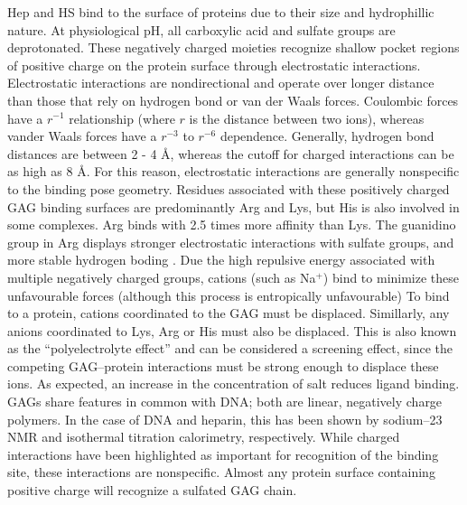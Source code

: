 \documentclass[journal=jctcce,manuscript=article]{achemso}
\begin{document}
{\ac{Hep} and \ac{HS} bind to the surface of proteins due to their size and hydrophillic nature. At physiological pH, all carboxylic acid and sulfate groups are deprotonated.\cite{Capila2002Heparin-proteinInteractions., Gandhi2008TheProteins, Casu2005StructureHeparin, Imberty2007StructuralInteractions}
These negatively charged moieties recognize shallow pocket regions of positive charge on the protein surface through electrostatic interactions.\cite{Capila2002Heparin-proteinInteractions., Gandhi2008TheProteins, Casu2005StructureHeparin, Imberty2007StructuralInteractions}
Electrostatic interactions are nondirectional and operate over longer distance than those that rely on hydrogen bond or van der Waals forces. Coulombic forces have a $ r^{-1}$  relationship (where $r$ is the distance between two ions), whereas vander Waals forces have a  $ r^{-3}$ to  $ r^{-6}$ dependence. \cite{Sankaranarayanan2014TowardProteins, Kirschner2008GLYCAM06:Carbohydrates} 
Generally, hydrogen bond distances are between 2 - 4 \AA, whereas the cutoff for charged interactions can be as high as 8 \AA. \cite{FerreiradeFreitas2017APDB}
For this reason, electrostatic interactions are generally nonspecific to the binding pose geometry.\cite{Sarkar2016EstimatingInteraction.}
Residues associated with these positively charged GAG binding surfaces are predominantly Arg and Lys, but His is also involved in some complexes. Arg binds with 2.5 times more affinity than Lys. \cite{Capila2002Heparin-proteinInteractions.}
The guanidino group in Arg displays stronger electrostatic interactions with sulfate groups, and more stable hydrogen boding \cite{Hileman1998Glycosaminoglycan-proteinProteins}. 
Due the high repulsive energy associated with multiple negatively charged groups, cations (such as Na$^{+}$) bind to minimize these unfavourable forces (although this process is entropically unfavourable)  \cite{Hileman1998Glycosaminoglycan-proteinProteins}
To bind to a protein, cations coordinated to the \ac{GAG} must be displaced. \cite{}
Simillarly, any anions coordinated to Lys, Arg or His must also be displaced. This is also known as the ``polyelectrolyte effect'' and can be considered a screening effect, since the competing GAG--protein interactions must be strong enough to displace these ions.\cite{CardinMolecularInteractions.}
As expected, an increase in the concentration of salt reduces ligand binding. \cite{Capila2002Heparin-proteinInteractions., Gandhi2008TheProteins} 
\acp{GAG} share features in common with DNA; both are linear, negatively charge polymers. 
In the case of DNA and heparin, this has been shown by sodium--23 NMR and isothermal titration calorimetry, respectively\cite{Anderson1978Sodium-23Interactions., Thompson1994EnergeticDomain}.  
While charged interactions have been highlighted as important for recognition of the binding site\cite{Samsonov2016ComputationalComplexes}, these interactions are nonspecific. Almost any protein surface containing positive charge will recognize a sulfated GAG chain.\cite{CardinMolecularInteractions.}

}
\end{document}
